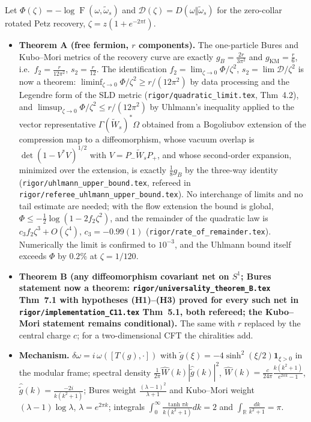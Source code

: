 \documentclass[11pt]{article}
\theoremstyle{accent}
\theoremstyle{definition}
\newcommand{\Fid}{\operatorname{F}}
\newcommand{\Wh}{\widehat W}
\newcommand{\gh}{\widehat{\widetilde g}}
\newcommand{\gt}{\widetilde g}
\begin{document}
\begin{mainbox}
Let \(\Phi(\zeta)=-\log\Fid(\omega,\widetilde\omega_s)\) and \(\mathcal D(\zeta)=D(\omega\Vert\widetilde\omega_s)\) for the zero-collar rotated Petz recovery, \(\zeta=z(1+e^{-2\pi t})\).
\begin{itemize}[leftmargin=1.4em,itemsep=2pt]
\item \textbf{Theorem A (free fermion, \(r\) components).}
The one-particle Bures and Kubo--Mori metrics of the recovery curve are exactly \(g_B=\frac{2r}{3\pi^2}\) and \(g_{\mathrm{KM}}=\frac r6\), i.e.\ \(f_2=\frac{r}{12\pi^2}\), \(s_2=\frac r{12}\).  The identification \(f_2=\lim_{\zeta\to0}\Phi/\zeta^2\), \(s_2=\lim\mathcal D/\zeta^2\) is now a theorem: \(\liminf_{\zeta\to0}\Phi/\zeta^2\ge r/(12\pi^2)\) by data processing and the Legendre form of the SLD metric (\texttt{rigor/quadratic\_limit.tex}, Thm~4.2), and \(\limsup_{\zeta\to0}\Phi/\zeta^2\le r/(12\pi^2)\) by Uhlmann's inequality applied to the vector representative \(\Gamma(\widetilde W_s)^*\Omega\) obtained from a Bogoliubov extension of the compression map to a diffeomorphism, whose vacuum overlap is \(\det(1-V^*V)^{1/2}\) with \(V=P_-\widetilde W_sP_+\), and whose second-order expansion, minimized over the extension, is exactly \(\tfrac18g_B\) by the three-way identity (\texttt{rigor/uhlmann\_upper\_bound.tex}, refereed in \texttt{rigor/referee\_uhlmann\_upper\_bound.tex}).  No interchange of limits and no tail estimate are needed; with the flow extension the bound is global, \(\Phi\le-\frac12\log(1-2f_2\zeta^2)\), and the remainder of the quadratic law is \(c_3f_2\zeta^3+O(\zeta^4)\), \(c_3=-0.99(1)\) (\texttt{rigor/rate\_of\_remainder.tex}).  Numerically the limit is confirmed to \(10^{-3}\), and the Uhlmann bound itself exceeds \(\Phi\) by \(0.2\%\) at \(\zeta=1/120\).
\item \textbf{Theorem B (any diffeomorphism covariant net on \(S^1\); Bures statement now a theorem: \texttt{rigor/universality\_theorem\_B.tex} Thm~7.1 with hypotheses (H1)--(H3) proved for every such net in \texttt{rigor/implementation\_C11.tex} Thm~5.1, both refereed; the Kubo--Mori statement remains conditional).}  The same with \(r\) replaced by the central charge \(c\); for a two-dimensional CFT the chiralities add.
\item \textbf{Mechanism.}  \(\delta\omega=i\,\omega([T(g),\cdot])\) with \(\gt(\xi)=-4\sinh^2(\xi/2)\mathbf 1_{\xi>0}\) in the modular frame; spectral density \(\frac1{2\pi}\Wh(k)|\gh(k)|^2\), \(\Wh(k)=\frac{c}{24\pi}\frac{k(k^2+1)}{e^{2\pi k}-1}\), \(\gh(k)=\frac{-2i}{k(k^2+1)}\); Bures weight \(\frac{(\lambda-1)^2}{\lambda+1}\) and Kubo--Mori weight \((\lambda-1)\log\lambda\), \(\lambda=e^{2\pi k}\); integrals \(\int_0^\infty\frac{\tanh\pi k}{k(k^2+1)}dk=2\) and \(\int_{\mathbb R}\frac{dk}{k^2+1}=\pi\).

\end{itemize}
\end{mainbox}
\end{document}
